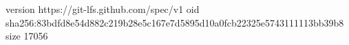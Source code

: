 version https://git-lfs.github.com/spec/v1
oid sha256:83bdfd8e54d882c219b28e5c167e7d5895d10a0fcb22325e5743111113bb39b8
size 17056
